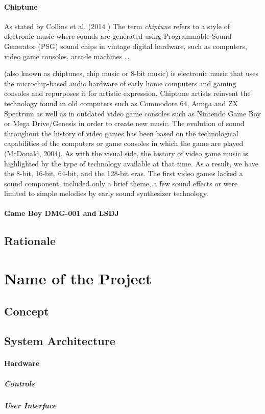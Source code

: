\documentclass[]{article}
\begin{document}
        \paragraph{Chiptune}
        As stated by Collins et al. (2014 )\nocite{COLLINS2014} The term \emph{chiptune} refers to a style of electronic music where 
        sounds are generated using Programmable Sound Generator (PSG) sound chips 
        in vintage digital hardware, such as computers, video game consoles, arcade machines \ldots
        
        (also known as chiptunes, chip music or 8-bit music) is electronic
music that uses the microchip-based audio hardware of early home computers
and gaming consoles and repurposes it for artistic expression. Chiptune artists
reinvent the technology found in old computers such as Commodore 64,
Amiga and ZX Spectrum as well as in outdated video game consoles such as
Nintendo Game Boy or Mega Drive/Genesis in order to create new music.
The evolution of sound throughout the history of video games has been
based on the technological capabilities of the computers or game consoles
in which the game are played (McDonald, 2004). As with the visual side,
the history of video game music is highlighted by the type of technology
available at that time. As a result, we have the 8-bit, 16-bit, 64-bit, and the
128-bit eras. The first video games lacked a sound component, included only
a brief theme, a few sound effects or were limited to simple melodies by early
sound synthesizer technology.
        \paragraph{Game Boy DMG-001 and LSDJ} %
    \subsection{Rationale} %


\section{Name of the Project} %
    \subsection{Concept}
    \subsection{System Architecture}
        \paragraph{Hardware}
            \subparagraph{Controls}
            \subparagraph{User Interface}
\end{document}

